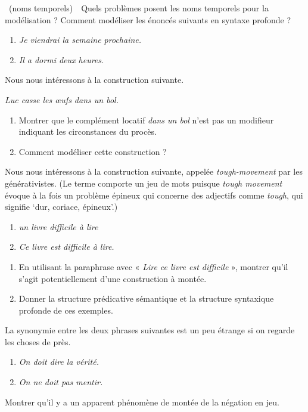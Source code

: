{~(noms temporels)\ \ Quels problèmes posent les noms temporels pour la modélisation ? Comment modéliser les énoncés suivants en syntaxe profonde ?
\begin{enumerate}[label=\alph*.]
\item\textit{Je viendrai la semaine prochaine.}
\item\textit{Il a dormi deux heures.}
\end{enumerate}

 Nous nous intéressons à la construction suivante.
\begin{exe}
\exi{}\textit{Luc casse les œufs dans un bol.}
\end{exe}
\begin{enumerate}
\item Montrer que le complément locatif \textit{dans un bol} n’est pas un modifieur indiquant les circonstances du procès.
\item Comment modéliser cette construction ?
\end{enumerate}

 Nous nous intéressons à la construction suivante, appelée \textit{tough-movement} par les générativistes. (Le terme comporte un jeu de mots puisque \textit{tough movement} évoque à la fois un problème épineux qui concerne des adjectifs comme \textit{tough}, qui signifie ‘dur, coriace, épineux’.)
\begin{enumerate}[label=\alph*.]
\item \textit{un livre difficile à lire}
\item\textit{Ce livre est difficile à lire.}
\end{enumerate}
\begin{enumerate}
\item En utilisant la paraphrase avec « \textit{Lire ce livre est difficile} », montrer qu’il s’agit potentiellement d’une construction à montée.
\item Donner la structure prédicative sémantique et la structure syntaxique profonde de ces exemples.
\end{enumerate}

 La synonymie entre les deux phrases suivantes est un peu étrange si on regarde les choses de près.
\begin{enumerate}[label=\alph*.]
\item \textit{On doit dire la vérité.}
\item \textit{On ne doit pas mentir.}
\end{enumerate}
Montrer qu’il y a un apparent phénomène de montée de la négation en jeu.}

